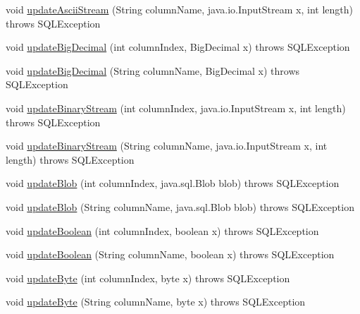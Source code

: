 \begin{DoxyCompactItemize}
\item 
void \mbox{\hyperlink{classcom_1_1mysql_1_1jdbc_1_1_updatable_result_set_ac539408d0c743944484724a8df4bf8c7}{update\+Ascii\+Stream}} (String column\+Name, java.\+io.\+Input\+Stream x, int length)  throws S\+Q\+L\+Exception 
\item 
void \mbox{\hyperlink{classcom_1_1mysql_1_1jdbc_1_1_updatable_result_set_ae8d8055f2d9a3075964d68982050df9e}{update\+Big\+Decimal}} (int column\+Index, Big\+Decimal x)  throws S\+Q\+L\+Exception 
\item 
void \mbox{\hyperlink{classcom_1_1mysql_1_1jdbc_1_1_updatable_result_set_acd7546dfd3c2aac7992447a458b3f9c8}{update\+Big\+Decimal}} (String column\+Name, Big\+Decimal x)  throws S\+Q\+L\+Exception 
\item 
void \mbox{\hyperlink{classcom_1_1mysql_1_1jdbc_1_1_updatable_result_set_a848439a6756f5600d13c02fb20ec8824}{update\+Binary\+Stream}} (int column\+Index, java.\+io.\+Input\+Stream x, int length)  throws S\+Q\+L\+Exception 
\item 
void \mbox{\hyperlink{classcom_1_1mysql_1_1jdbc_1_1_updatable_result_set_a6475f3584890264f9c67c2e749c37141}{update\+Binary\+Stream}} (String column\+Name, java.\+io.\+Input\+Stream x, int length)  throws S\+Q\+L\+Exception 
\item 
void \mbox{\hyperlink{classcom_1_1mysql_1_1jdbc_1_1_updatable_result_set_ad0944789b1d55512febb7da626bed70d}{update\+Blob}} (int column\+Index, java.\+sql.\+Blob blob)  throws S\+Q\+L\+Exception 
\item 
void \mbox{\hyperlink{classcom_1_1mysql_1_1jdbc_1_1_updatable_result_set_a45f34643eaea2f5cdf81f8ac0589607c}{update\+Blob}} (String column\+Name, java.\+sql.\+Blob blob)  throws S\+Q\+L\+Exception 
\item 
void \mbox{\hyperlink{classcom_1_1mysql_1_1jdbc_1_1_updatable_result_set_ad7bcfc97b47f3037e44a2b4271a92f61}{update\+Boolean}} (int column\+Index, boolean x)  throws S\+Q\+L\+Exception 
\item 
void \mbox{\hyperlink{classcom_1_1mysql_1_1jdbc_1_1_updatable_result_set_a5070cb2945792ee2e9f66f659df8b38a}{update\+Boolean}} (String column\+Name, boolean x)  throws S\+Q\+L\+Exception 
\item 
void \mbox{\hyperlink{classcom_1_1mysql_1_1jdbc_1_1_updatable_result_set_a82e4ac17d1f8d3b8cdb10d1a6220796d}{update\+Byte}} (int column\+Index, byte x)  throws S\+Q\+L\+Exception 
\item 
void \mbox{\hyperlink{classcom_1_1mysql_1_1jdbc_1_1_updatable_result_set_afcff8e1503aeeb94781ec5e18c5cf13d}{update\+Byte}} (String column\+Name, byte x)  throws S\+Q\+L\+Exception 

\end{DoxyCompactItemize}
